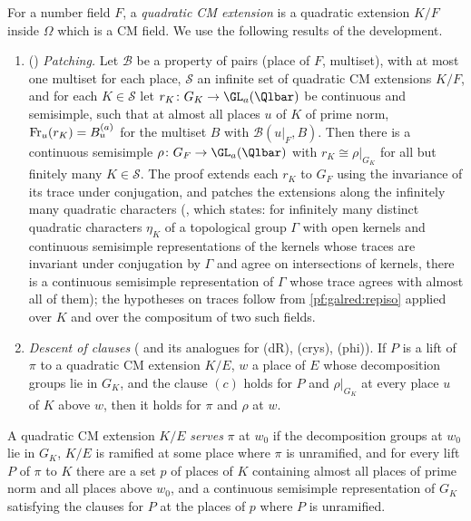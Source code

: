 For a number field $F$, a \emph{quadratic CM extension} is a quadratic extension $K/F$ inside $\Omega$ which is a CM field. We
use the following results of the development.
\begin{enumerate}[label=(\roman*),nosep]
\item () \emph{Patching.} Let $\mathcal B$ be a property of pairs (place of $F$,
  multiset), with at most one multiset for each place, $\mathcal S$ an infinite set of quadratic CM extensions $K/F$, and
  for each $K\in\mathcal S$ let $r_K\colon G_K\to\GL_a(\Qlbar)$ be continuous and semisimple, such that at almost all places $u$
  of $K$ of prime norm, $\operatorname{Fr}_u(r_K)=B^{(a)}_u$ for the multiset $B$ with $\mathcal B(u|_F,B)$. Then there is a continuous
  semisimple $\rho\colon G_F\to\GL_a(\Qlbar)$ with $r_K\cong\rho|_{G_K}$ for all but finitely many $K\in\mathcal S$. The proof
  extends each $r_K$ to $G_F$ using the invariance of its trace under conjugation, and patches the extensions along the
  infinitely many quadratic characters (, which states: for infinitely many distinct
  quadratic characters $\eta_K$ of a topological group $\Gamma$ with open kernels and continuous semisimple representations of
  the kernels whose traces are invariant under conjugation by $\Gamma$ and agree on intersections of kernels, there is a
  continuous semisimple representation of $\Gamma$ whose trace agrees with almost all of them); the hypotheses on traces
  follow from \cref{pf:galred:repiso} applied over $K$ and over the compositum of two such fields.
\item \emph{Descent of clauses} ( and its analogues for (dR), (crys), (phi)).
  If $P$ is a lift of $\pi$ to a quadratic CM extension $K/E$, $w$ a place of $E$ whose decomposition groups lie in $G_K$, and
  the clause $(c)$ holds for $P$ and $\rho|_{G_K}$ at every place $u$ of $K$ above $w$, then it holds for $\pi$ and $\rho$ at $w$.
\end{enumerate}

A quadratic CM extension $K/E$ \emph{serves} $\pi$ at $w_0$ if the decomposition groups at $w_0$ lie in $G_K$, $K/E$ is
ramified at some place where $\pi$ is unramified, and for every lift $P$ of $\pi$ to $K$ there are a set $p$ of places of $K$
containing almost all places of prime norm and all places above $w_0$, and a continuous semisimple representation of
$G_K$ satisfying the clauses for $P$ at the places of $p$ where $P$ is unramified.


